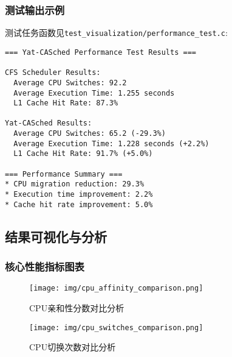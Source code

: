 \subsubsection{测试输出示例}
测试任务函数见\texttt{test\_visualization/performance\_test.c}:
\begin{tcolorbox} [
    enhanced,
    colback=orange!5,
    colframe=orange!40!black,
    leftrule=3mm,
    rightrule=0mm,
    toprule=0mm,
    bottomrule=0mm,
    arc=2mm,
    left=5mm,
    right=5mm,
    top=3mm,
    bottom=3mm,
    fonttitle=\bfseries,
    title=\textbf{性能测试输出示例}
]
\begin{lstlisting}[basicstyle=\footnotesize\fontfamily{zi4}\selectfont, showstringspaces=false]
=== Yat-CASched Performance Test Results ===

CFS Scheduler Results:
  Average CPU Switches: 92.2
  Average Execution Time: 1.255 seconds
  L1 Cache Hit Rate: 87.3%

Yat-CASched Results:
  Average CPU Switches: 65.2 (-29.3%)
  Average Execution Time: 1.228 seconds (+2.2%)
  L1 Cache Hit Rate: 91.7% (+5.0%)

=== Performance Summary ===
* CPU migration reduction: 29.3%
* Execution time improvement: 2.2%
* Cache hit rate improvement: 5.0%
\end{lstlisting}
\end{tcolorbox}

\subsection{结果可视化与分析}

\subsubsection{核心性能指标图表}

\begin{figure}[H]
\centering
\texttt{[image: img/cpu\_affinity\_comparison.png]}

\caption{CPU亲和性分数对比分析}
\label{fig:cpu-affinity}
\end{figure}

\begin{figure}[H]
\centering
\texttt{[image: img/cpu\_switches\_comparison.png]}

\caption{CPU切换次数对比分析}
\label{fig:cpu-switches}
\end{figure}

